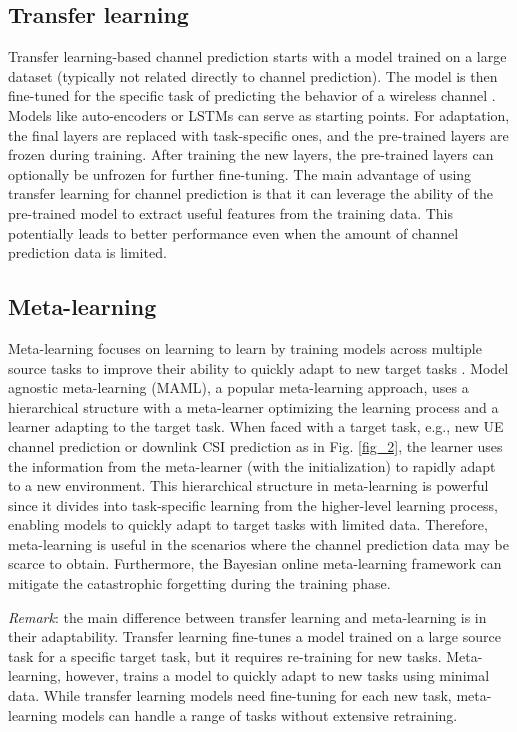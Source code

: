 \documentclass[lettersize,journal]{IEEEtran}
\begin{document}
\subsection{Transfer learning}
Transfer learning-based channel prediction starts with a model trained on a large dataset (typically not related directly to channel prediction). The model is then fine-tuned for the specific task of predicting the behavior of a wireless channel \cite{Yuan21}. Models like auto-encoders or LSTMs can serve as starting points. For adaptation, the final layers are replaced with task-specific ones, and the pre-trained layers are frozen during training. After training the new layers, the pre-trained layers can optionally be unfrozen for further fine-tuning. The main advantage of using transfer learning for channel prediction is that it can leverage the ability of the pre-trained model to extract useful features from the training data. This potentially leads to better performance even when the amount of channel prediction data is limited.

\subsection{Meta-learning}
Meta-learning focuses on learning to learn by training models across multiple source tasks to improve their ability to quickly adapt to new target tasks \cite{Kim23}. Model agnostic meta-learning (MAML), a popular meta-learning approach, uses a hierarchical structure with a meta-learner optimizing the learning process and a learner adapting to the target task. When faced with a target task, e.g., new UE channel prediction or downlink CSI prediction as in Fig. \ref{fig_2}, the learner uses the information from the meta-learner (with the initialization) to rapidly adapt to a new environment. This hierarchical structure in meta-learning is powerful since it divides into task-specific learning from the higher-level learning process, enabling models to quickly adapt to  target tasks with limited data. Therefore, meta-learning is useful in the scenarios where the channel prediction data may be scarce to obtain. Furthermore, the Bayesian online meta-learning framework can mitigate the catastrophic forgetting during the training phase.

\textit{Remark}: the main difference between transfer learning and meta-learning is in their adaptability. Transfer learning fine-tunes a model trained on a large source task for a specific target task, but it requires re-training for new tasks. Meta-learning, however, trains a model to quickly adapt to new tasks using minimal data. While transfer learning models need fine-tuning for each new task, meta-learning models can handle a range of tasks without extensive retraining.
\end{document}
